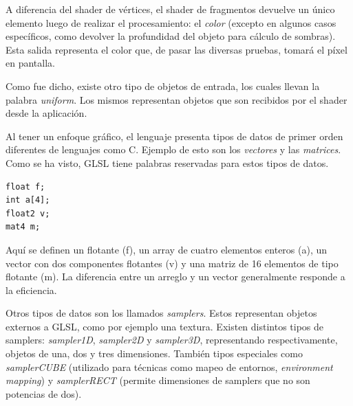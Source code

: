 
A diferencia del shader de vértices, el shader de fragmentos devuelve un único elemento luego de realizar el procesamiento: el {\em color} (excepto en algunos casos específicos, como devolver la profundidad del objeto para cálculo de sombras).
Esta salida representa el color que, de pasar las diversas pruebas, tomar\'a el p\'ixel en pantalla.

Como fue dicho, existe otro tipo de objetos de entrada, los cuales llevan la palabra {\em uniform}. Los mismos representan objetos que son recibidos por el shader desde la aplicaci\'on.


Al tener un enfoque gr\'afico, el lenguaje presenta tipos de datos de primer orden diferentes de lenguajes como C. Ejemplo de esto son los {\em vectores} y las {\em matrices}. Como se ha visto, GLSL tiene palabras reservadas para estos tipos de datos.
\begin{verbatim}
float f;
int a[4];
float2 v;
mat4 m;
\end{verbatim}
Aqu\'i se definen un flotante (f), un array de cuatro elementos enteros (a), un vector con dos componentes flotantes (v) y una matriz de 16 elementos de tipo flotante (m).
La diferencia entre un arreglo y un vector generalmente responde a la eficiencia.

Otros tipos de datos son los llamados {\em samplers}. Estos representan objetos externos a GLSL, como por ejemplo una textura.
Existen distintos tipos de samplers: {\em sampler1D}, {\em sampler2D} y {\em sampler3D}, representando respectivamente, objetos de una, dos y tres dimensiones. Tambi\'en tipos especiales como {\em samplerCUBE} (utilizado para t\'ecnicas como mapeo de entornos, {\em environment mapping}) y {\em samplerRECT} (permite dimensiones de samplers que no son potencias de dos).

